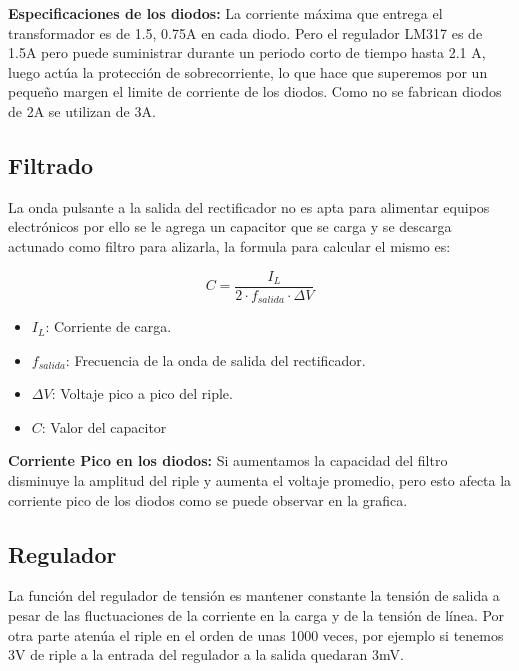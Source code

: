 \sangria{} \textbf{Especificaciones de los diodos:} 
\sangria{} La corriente máxima que entrega el transformador es de 1.5, 0.75A en cada diodo. Pero el regulador LM317 es de 1.5A pero puede suministrar durante un
periodo corto de tiempo hasta 2.1 A, luego actúa la protección de sobrecorriente, lo que hace que superemos por un pequeño margen el limite de corriente de los diodos.
\sangria{}Como no se fabrican diodos de 2A se utilizan de 3A.
\columnbreak{}
\subsection{Filtrado}
La onda pulsante a la salida del rectificador no es apta para alimentar
equipos electrónicos por ello se le agrega un capacitor que se carga y se descarga actunado como filtro para alizarla, la formula para calcular el mismo es:

\begin{equation*}
    C = \frac{I_L}{2 \cdot f_{salida} \cdot \Delta V}
\end{equation*}
\begin{itemize}
    \item $I_L$: Corriente de carga.
    \item $f_{salida}$: Frecuencia de la onda de salida del rectificador.
    \item $\Delta V$: Voltaje pico a pico del riple.
    \item $C$: Valor del capacitor
\end{itemize}

\sangria{} \textbf{Corriente Pico en los diodos:}
\sangria{} Si aumentamos la capacidad del filtro disminuye la amplitud del riple y
aumenta el voltaje promedio, pero esto afecta la corriente pico de los
diodos como se puede observar en la grafica.


\saltoPag{}
\subsection{Regulador}
\sangria{} La función del regulador de tensión es mantener constante la tensión de
salida a pesar de las fluctuaciones de la corriente en la carga y de la
tensión de línea.
\sangria{} Por otra parte atenúa el riple en el orden de unas 1000 veces, por ejemplo
si tenemos 3V de riple a la entrada del regulador a la salida quedaran 3mV.

